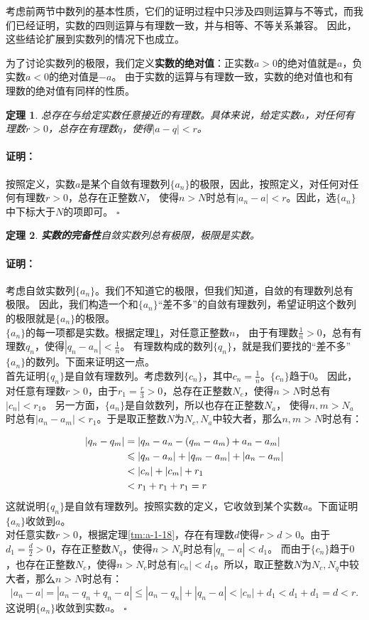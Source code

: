 \documentclass[12pt,UTF8]{ctexbook}
\newtheorem{tm}{定理}[section]
\renewenvironment{proof}{\paragraph{\textbf{证明：}}}{\hfill$\square$}
\begin{document}
\begin{appendix}
考虑前两节中数列的基本性质，它们的证明过程中只涉及四则运算与不等式，而我们已经证明，实数的四则运算与有理数一致，并与相等、不等关系兼容。
因此，这些结论扩展到实数列的情况下也成立。

为了讨论实数列的极限，我们定义\textbf{实数的绝对值}：正实数$a>0$的绝对值就是$a$，负实数$a<0$的绝对值是$-a$。
由于实数的运算与有理数一致，实数的绝对值也和有理数的绝对值有同样的性质。

\begin{tm}\label{tm:a-1-35}
    总存在与给定实数任意接近的有理数。具体来说，给定实数$a$，对任何有理数$r>0$，总存在有理数$q$，使得$|a - q| < r$。
\end{tm}
\begin{proof}
    按照定义，实数$a$是某个自敛有理数列$\{a_n\}$的极限，因此，按照定义，对任何对任何有理数$r>0$，总存在正整数$N$，
    使得$n>N$时总有$|a_n - a| < r$。因此，选$\{a_n\}$中下标大于$N$的项即可。
\end{proof}

\begin{tm}\textbf{实数的完备性}\label{tm:a-1-40}
    自敛实数列总有极限，极限是实数。
\end{tm}

\begin{proof}
    考虑自敛实数列$\{a_n\}$。我们不知道它的极限，但我们知道，自敛的有理数列总有极限。
    因此，我们构造一个和$\{a_n\}$“差不多”的自敛有理数列，希望证明这个数列的极限就是$\{a_n\}$的极限。\\
    $\{a_n\}$的每一项都是实数。根据定理\ref{tm:a-1-35}，对任意正整数$n$，
    由于有理数$\frac{1}{n}>0$，总有有理数$q_n$，使得$|q_n - a_n| < \frac{1}{n}$。
    有理数构成的数列$\{q_n\}$，就是我们要找的“差不多”$\{a_n\}$的数列。下面来证明这一点。\\
    首先证明$\{q_n\}$是自敛有理数列。考虑数列$\{c_n\}$，其中$c_n = \frac{1}{n}$。$\{c_n\}$趋于$0$。
    因此，对任意有理数$r>0$，由于$r_1 = \frac{r}{3} > 0$，总存在正整数$N_c$，使得$n>N$时总有$|c_n| < r_1$。
    另一方面，$\{a_n\}$是自敛数列，所以也存在正整数$N_a$，
    使得$n,m>N_a$时总有$|a_n - a_m| < r_1$。于是取正整数$N$为$N_c,N_a$中较大者，那么$n,m>N$时总有：

    \begin{align}
        |q_n - q_m| &= |q_n - a_n - (q_m - a_m) + a_n -a_m| \notag \\
        &\leqslant |q_n - a_n| + |q_m - a_m| + |a_n - a_m| \notag \\
        &< |c_n| + |c_m| + r_1 \notag \\
        &< r_1 + r_1 + r_1 = r \notag
    \end{align}
    这就说明$\{q_n\}$是自敛有理数列。按照实数的定义，它收敛到某个实数$a$。下面证明$\{a_n\}$收敛到$a$。\\
    对任意实数$r>0$，根据定理\ref{tm:a-1-18}，存在有理数$d$使得$r>d>0$。由于$d_1 = \frac{d}{2}>0$，存在正整数$N_q$，使得$n>N_q$时总有$|q_n - a| < d_1$。
    而由于$\{c_n\}$趋于$0$，也存在正整数$N_c$，使得$n>N_c$时总有$|c_n| < d_1$。所以，取正整数$N$为$N_c,N_q$中较大者，那么$n>N$时总有：
    $$ |a_n - a| = |a_n - q_n + q_n - a| \leqslant |a_n - q_n| + |q_n - a| < |c_n| + d_1 < d_1 + d_1 = d < r.$$
    这说明$\{a_n\}$收敛到实数$a$。
\end{proof}


\end{appendix}
\end{document}
